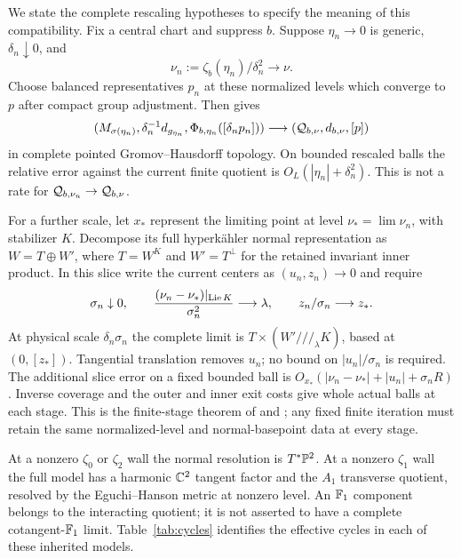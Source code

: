 We state the complete rescaling hypotheses to specify
the meaning of this compatibility. Fix a central chart
and suppress $b$. Suppose $\eta_n\to0$ is generic,
$\delta_n\downarrow0$, and
\begin{equation}\label{eq:normalized-level}
 \nu_n:=\zeta_b(\eta_n)/\delta_n^2\longrightarrow\nu.
\end{equation}
Choose balanced representatives $p_n$ at these normalized
levels which converge to $p$ after compact group adjustment.
Then \cite[\S8.3 and Theorem~8.1]{wuebben17} gives
\begin{equation}\label{eq:complete-limit}
 (M_{\sigma(\eta_n)},\delta_n^{-1}d_{g_{\eta_n}},
       \Phi_{b,\eta_n}([\delta_np_n]))
 \longrightarrow(\mathcal Q_{b,\nu},d_{b,\nu},[p])
\end{equation}
in complete pointed Gromov--Hausdorff topology. On bounded
rescaled balls the relative error against the current
finite quotient is $O_L(|\eta_n|+\delta_n^2)$. This is
not a rate for $\mathcal Q_{b,\nu_n}\to\mathcal Q_{b,\nu}$.

For a further scale, let $x_*$ represent the limiting
point at level $\nu_* =\lim\nu_n$, with stabilizer $K$.
Decompose its full hyperk\"ahler normal representation as
$W=T\oplus W'$, where $T=W^K$ and $W'=T^\perp$ for the
retained invariant inner product. In this slice write
the current centers as $(u_n,z_n)\to0$ and require
\begin{equation}\label{eq:successive}
 \sigma_n\downarrow0,\qquad
 \frac{(\nu_n-\nu_*)|_{\operatorname{Lie} K}}{\sigma_n^2}\longrightarrow\lambda,
 \qquad z_n/\sigma_n\longrightarrow z_*.
\end{equation}
At physical scale $\delta_n\sigma_n$ the complete limit
is $T\times(W'\!\mathbin{/\!\!/\!/}_{\lambda}K)$,
based at $(0,[z_*])$. Tangential translation removes $u_n$;
no bound on $|u_n|/\sigma_n$ is required. The additional
slice error on a fixed bounded ball is
$O_{x_*}(|\nu_n-\nu_*|+|u_n|+\sigma_n R)$.
Inverse coverage and the outer and inner exit costs
give whole actual balls at each stage. This is the
finite-stage theorem of \cite[Theorem~8.1]{wuebben17}
and \cite[Proposition~8.3]{wuebben18}; any fixed finite
iteration must retain the same normalized-level and
normal-basepoint data at every stage.

At a nonzero $\zeta_0$ or $\zeta_2$ wall the normal
resolution is $T^*\mathbb P^2$. At a nonzero $\zeta_1$ wall
the full model has a harmonic $\mathbb C^2$ tangent factor
and the $A_1$ transverse quotient, resolved by the
Eguchi--Hanson metric at nonzero level. An $\mathbb F_1$
component belongs to the interacting quotient; it is
not asserted to have a complete cotangent-$\mathbb F_1$
limit. Table~\ref{tab:cycles} identifies the effective
cycles in each of these inherited models.

